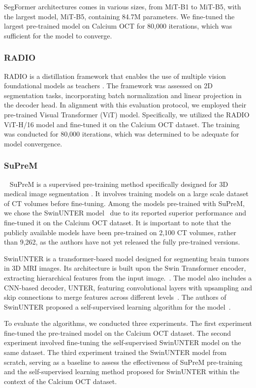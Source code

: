 \documentclass[a4paper,11pt,oneside]{report}
\begin{document}
SegFormer architectures comes in various sizes, from MiT-B1 to MiT-B5, with the largest model, MiT-B5, containing 84.7M parameters. We fine-tuned the largest pre-trained model on Calcium OCT for 80,000 iterations, which was sufficient for the model to converge.

\subsubsection{RADIO}
RADIO is a distillation framework that enables the use of multiple vision foundational models as teachers \cite{Ranzinger2024RADIO}. The framework was assessed on 2D segmentation tasks, incorporating batch normalization and linear projection in the decoder head. In alignment with this evaluation protocol, we employed their pre-trained Visual Transformer (ViT) model. Specifically, we utilized the RADIO ViT-H/16 model and fine-tuned it on the Calcium OCT dataset. The training was conducted for 80,000 iterations, which was determined to be adequate for model convergence.

\subsubsection{SuPreM}~\label{sec:design:suprem}
SuPreM is a supervised pre-training method specifically designed for 3D medical image segmentation \cite{Li2024}. It involves training models on a large scale dataset of CT volumes before fine-tuning. Among the models pre-trained with SuPreM, we chose the SwinUNTER model~\cite{Tang2022} due to its reported superior performance and fine-tuned it on the Calcium OCT dataset. It is important to note that the publicly available models have been pre-trained on 2,100 CT volumes, rather than 9,262, as the authors have not yet released the fully pre-trained versions.

SwinUNTER is a transformer-based model designed for segmenting brain tumors in 3D MRI images. Its architecture is built upon the Swin Transformer encoder, extracting hierarchical features from the input image.~\cite{Liu2021Swin}. The model also includes a CNN-based decoder, UNTER, featuring convolutional layers with upsampling and skip connections to merge features across different levels~\cite{Hatamizadeh2022}. The authors of SwinUNTER proposed a self-supervised learning algorithm for the model~\cite{Tang2022}. 

To evaluate the algorithms, we conducted three experiments. The first experiment fine-tuned the pre-trained model on the Calcium OCT dataset. The second experiment involved fine-tuning the self-supervised SwinUNTER model on the same dataset. The third experiment trained the SwinUNTER model from scratch, serving as a baseline to assess the effectiveness of SuPreM pre-training and the self-supervised learning method proposed for SwinUNTER within the context of the Calcium OCT dataset.
\end{document}
